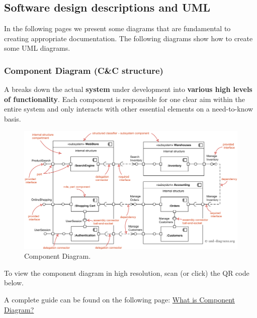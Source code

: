 \subsection{Software design descriptions and UML}

In the following pages we present some diagrams that are fundamental to creating appropriate documentation. The following diagrams show how to create some UML diagrams.

\subsubsection{Component Diagram (C\&C structure)}

A  breaks down the actual \textbf{system} under development into \textbf{various high levels of functionality}. Each component is responsible for one clear aim within the entire system and only interacts with other essential elements on a need-to-know basis.

\begin{figure}[!htp]
    \centering
    \includegraphics[width=\textwidth]{img/component-diagram.png}
    \caption{Component Diagram.}
\end{figure}

\noindent
To view the component diagram in high resolution, scan (or click) the QR code below.
\begin{center}
\end{center}
A complete guide can be found on the following page: \href{https://www.visual-paradigm.com/guide/uml-unified-modeling-language/what-is-component-diagram/}{What is Component Diagram?
}

